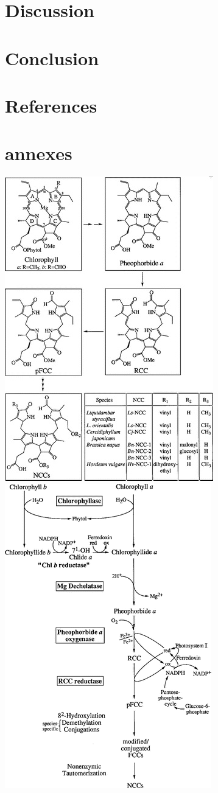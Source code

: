 \documentclass[a4paper, 11pt]{article}
\begin{document}
\section{Discussion}
\section{Conclusion}
\section{References}


\restoregeometry
\section{annexes}
\includegraphics{figura1} \cite{Matile1999}\\
\includegraphics{figura2}
\end{document}
